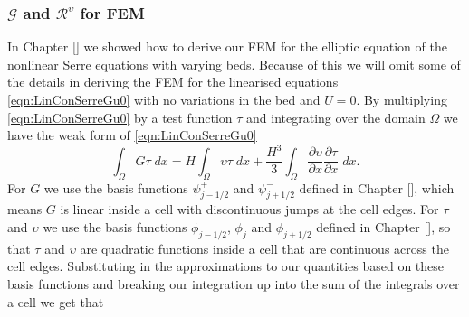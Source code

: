  \subsubsection{$\mathcal{G}$ and $\mathcal{R}^\upsilon$ for FEM}
 In Chapter [] we showed how to derive our FEM for the elliptic equation of the nonlinear Serre equations with varying beds. Because of this we will omit some of the details in deriving the FEM for the linearised equations \eqref{eqn:LinConSerreGu0} with no variations in the bed and $U=0$. By multiplying \eqref{eqn:LinConSerreGu0} by a test function $\tau$ and integrating over the domain $\Omega$ we have the weak form of  \eqref{eqn:LinConSerreGu0}
 \begin{equation*}
 \int_{\Omega}G \tau \; dx =  H\int_{\Omega} \upsilon \tau \; dx  + \frac{H^3}{3} \int_{\Omega} \frac{\partial \upsilon}{\partial x } \frac{\partial \tau}{\partial x }\; dx.
 \end{equation*}
 For $G$ we use the basis functions $\psi^+_{j - 1/2}$ and $\psi^-_{j + 1/2}$ defined in Chapter [], which means $G$ is linear inside a cell with discontinuous jumps at the cell edges. For $\tau$ and $\upsilon$ we use the basis functions $\phi_{j-1/2}$, $\phi_{j}$ and $\phi_{j+1/2}$ defined in Chapter [], so that $\tau$ and $\upsilon$ are quadratic functions inside a cell that are continuous across the cell edges. Substituting in the approximations to our quantities based on these basis functions and breaking our integration up into the sum of the integrals over a cell we get that
 
